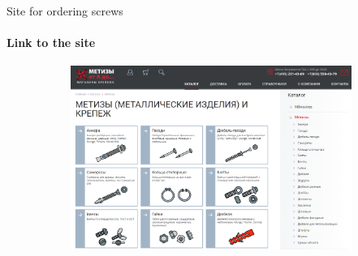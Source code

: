 \documentclass[aspectratio=169]{beamer}
\begin{document}
\begin{frame}[t]{Site for ordering screws}
    \framesubtitle{Link to the site}
    \vspace{-0.6cm}
    \begin{figure}[H]
        \href{https://grover-sk.ru/catalog/metizy/}{
            \centering\includegraphics[height=6cm,width=1\textwidth,keepaspectratio]{metiz_site.png}}
        \label{fig:metiz_site.png}
    \end{figure}
\end{frame}
\end{document}
